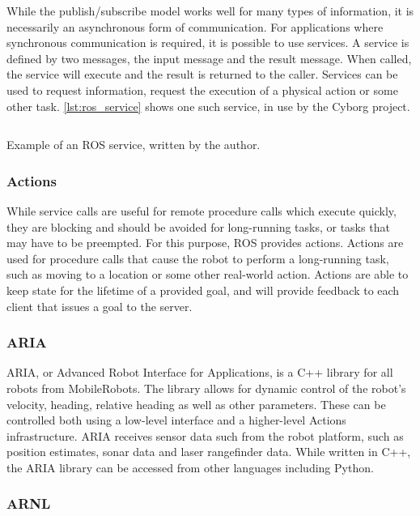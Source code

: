 \documentclass[\rootfolder/main.tex]{subfiles}
\begin{document}
While the publish/subscribe model works well for many types of information, it is necessarily an asynchronous form of communication.
For applications where synchronous communication is required, it is possible to use services.
A service is defined by two messages, the input message and the result message.
When called, the service will execute and the result is returned to the caller.
Services can be used to request information, request the execution of a physical action or some other task.
\cref{lst:ros_service} shows one such service, in use by the Cyborg project.

\begin{listing}
    \inputminted{python}{\rootfolder/Chapters/Chapter2/Listings/distance_to_goal.py}
    \caption{Example of an ROS service, written by the author.}
    \label{lst:ros_service}
\end{listing}

\subsubsection{Actions}

While service calls are useful for remote procedure calls which execute quickly, they are blocking and should be avoided for long-running tasks, or tasks that may have to be preempted.
For this purpose, ROS provides actions.
Actions are used for procedure calls that cause the robot to perform a long-running task, such as moving to a location or some other real-world action.
Actions are able to keep state for the lifetime of a provided goal, and will provide feedback to each client that issues a goal to the server.

\subsubsection{ARIA}

ARIA, or Advanced Robot Interface for Applications, is a C++ library for all robots from MobileRobots.
The library allows for dynamic control of the robot's velocity, heading, relative heading as well as other parameters.
These can be controlled both using a low-level interface and a higher-level Actions infrastructure.
ARIA receives sensor data such from the robot platform, such as position estimates, sonar data and laser rangefinder data.
While written in C++, the ARIA library can be accessed from other languages including Python.

\subsubsection{ARNL}
\end{document}
